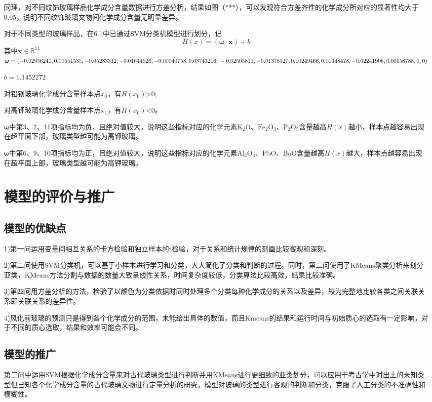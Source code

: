 \documentclass[withoutpreface,bwprint]{cumcmthesis}
\newcommand{\mr}[1]{\mathrm{#1}}
\begin{document}
同理，对不同纹饰玻璃样品化学成分含量数据进行方差分析，结果如图（***），可以发现符合方差齐性的化学成分所对应的显著性均大于0.05，说明不同纹饰玻璃文物间化学成分含量无明显差异。

对于不同类型的玻璃样品，在6.1中已通过SVM分类机模型进行划分，记
$$H(x)=(\bm{\omega} \cdot \bm{x})+b$$
其中$\bm{x}\in \mathbb{R}^{14}$
$\bm{\omega} =(-0.02956241,0.00551535,-0.05283312,-0.01644926,-0.00040758,0.03743216,\\-0.02505811,-0.01378527,0.10249466,0.01348478,-0.02241906,0.00158788,0,0)$

$b=1.1452272$

对铅钡玻璃化学成分含量样本点$x_0$，有$H(x_0)$>0;

对高钾玻璃化学成分含量样本点$x_1$，有$H(x_0)$<0。

$\bm{\omega}$中第3、7、11项指标均为负，且绝对值较大，说明这些指标对应的化学元素$\mr{K_2O}$、$\mr{Fe_2O_3}$、$\mr{P_2O_5}$含量越高$H(x)$越小，样本点越容易出现在超平面下部，玻璃类型越可能为高钾玻璃。

$\bm{\omega}$中第6、9、10项指标均为正，且绝对值较大，说明这些指标对应的化学元素$\mr{Al_2O_3}$、PbO、BaO含量越高$H(x)$越大，样本点越容易出现在超平面上部，玻璃类型越可能为高钾玻璃。
\section{模型的评价与推广}
\subsection{模型的优缺点}
1)第一问运用变量间相互关系的卡方检验和独立样本的t检验，对于关系和统计规律的刻画比较客观和深刻。

2)第二问使用SVM分类机，可以基于小样本进行学习和分类，大大简化了分类和判断的过程。同时，第二问使用了KMeans聚类分析来划分亚类，KMeans方法分割与数据的数量大致呈线性关系，时间复杂度较低，分类算法比较高效，结果比较准确。

3)第四问用方差分析的方法，检验了以颜色为分类依据时同时处理多个分类每种化学成分的关系以及差异，较为完整地比较各类之间关联关系即关联关系的差异性。

4)风化前玻璃的预测只是得到各个化学成分的范围，未能给出具体的数值，而且Kmeans的结果和运行时间与初始质心的选取有一定影响，对于不同的质心选取，结果和效率可能会不同。

\subsection{模型的推广}
第二问中运用SVM根据化学成分含量来对古代玻璃类型进行判断并用KMeans进行更细致的亚类划分，可以应用于考古学中对出土的未知类型但已知各个化学成分含量的古代玻璃文物进行定量分析的研究，模型对玻璃的类型进行客观的判断和分类，克服了人工分类的不准确性和模糊性。
\end{document}
